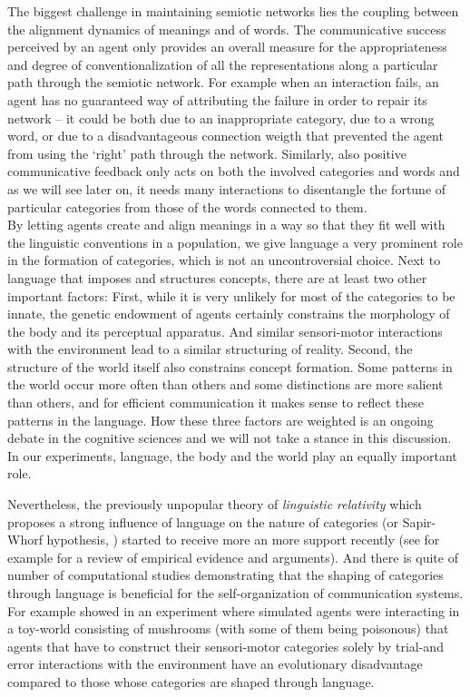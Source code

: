 The biggest challenge in maintaining semiotic networks lies the
coupling between the alignment dynamics of meanings and of words. The
communicative success perceived by an agent only provides an overall
measure for the appropriateness and degree of conventionalization of
all the representations along a particular path through the semiotic
network. For example when an interaction fails, an agent has no
guaranteed way of attributing the failure in order to repair its
network -- it could be both due to an inappropriate category, due to a
wrong word, or due to a disadvantageous connection weigth that
prevented the agent from using the `right' path through the network.
Similarly, also positive communicative feedback only acts on both the
involved categories and words and as we will see later on, it needs
many interactions to disentangle the fortune of particular categories
from those of the words connected to them.\\


\noindent By letting agents create and align meanings in a way so that
they fit well with the linguistic conventions in a population, we give
language a very prominent role in the formation of categories, which
is not an uncontroversial choice. Next to language that imposes and
structures concepts, there are at least two other important factors:
First, while it is very unlikely for most of the categories to be
innate, the genetic endowment of agents certainly constrains the
morphology of the body and its perceptual apparatus. And similar
sensori-motor interactions with the environment lead to a similar
structuring of reality. Second, the structure of the world itself also
constrains concept formation. Some patterns in the world occur more
often than others and some distinctions are more salient than others,
and for efficient communication it makes sense to reflect these
patterns in the language. How these three factors are weighted is an
ongoing debate in the cognitive sciences and we will not take a stance
in this discussion. In our experiments, language, the body and the
world play an equally important role.

Nevertheless, the previously unpopular theory of \emph{linguistic
  relativity} which proposes a strong influence of language on the
nature of categories (or Sapir-Whorf hypothesis,
\citealp{whorf56language}) started to receive more an more support
recently (see for example \citealp{levinson01language} for a review of
empirical evidence and arguments). And there is quite of number of
computational studies demonstrating that the shaping of categories
through language is beneficial for the self-organization of
communication systems. For example \citep{cangelosi02adaptive} showed
in an experiment where simulated agents were interacting in a
toy-world consisting of mushrooms (with some of them being poisonous)
that agents that have to construct their sensori-motor categories
solely by trial-and error interactions with the environment have an
evolutionary disadvantage compared to those whose categories are
shaped through language.


